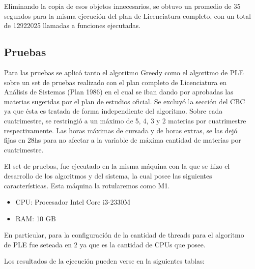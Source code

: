 \documentclass[a4paper]{article}
\begin{document}
Eliminando la copia de esos objetos innecesarios, se obtuvo un promedio de 35 segundos para la misma ejecución del plan de Licenciatura completo, con un total de 12922025 llamadas a funciones ejecutadas.


\subsection{Pruebas}

Para las pruebas se aplicó tanto el algoritmo Greedy como el algoritmo de PLE sobre un set de pruebas realizado con el plan completo de Licenciatura en Análisis de Sistemas (Plan 1986) en el cual se iban dando por aprobadas las materias sugeridas por el plan de estudios oficial. Se excluyó la sección del CBC ya que ésta es tratada de forma independiente del algoritmo. Sobre cada cuatrimestre, se restringió a un máximo de 5, 4, 3 y 2 materias por cuatrimestre respectivamente. Las horas máximas de cursada y de horas extras, se las dejó fijas en 28hs para no afectar a la variable de máxima cantidad de materias por cuatrimestre.

El set de pruebas, fue ejecutado en la misma máquina con la que se hizo el desarrollo de los algoritmos y del sistema, la cual posee las siguientes características. Esta máquina la rotularemos como M1.

\begin{itemize}
	\item CPU: Procesador Intel Core i3-2330M
	\item RAM: 10 GB
\end{itemize}

En particular, para la configuración de la cantidad de threads para el algoritmo de PLE fue seteada en 2 ya que es la cantidad de CPUs que posee.

Los resultados de la ejecución pueden verse en la siguientes tablas:
\end{document}
